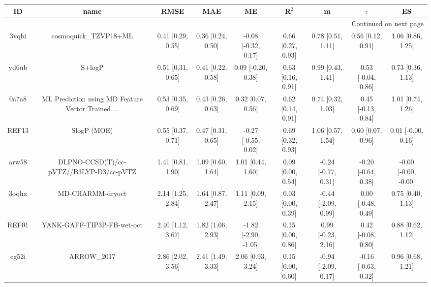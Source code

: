 \documentclass{article}
\begin{document}
\begin{center}
\scriptsize
\begin{longtable}{|ccccccccc|}
\toprule
    ID &                                               name &               RMSE &                MAE &                    ME &              R$^2$ &                    m &               $\tau$ &                    ES \\
\midrule
\endhead
\midrule
\multicolumn{9}{r}{{Continued on next page}} \\
\midrule
\endfoot

\bottomrule
\endlastfoot
 3vqbi &                              cosmoquick\_TZVP18+ML &  0.41 [0.29, 0.55] &  0.36 [0.24, 0.50] &   -0.08 [-0.32, 0.17] &  0.66 [0.27, 0.93] &    0.78 [0.51, 1.11] &    0.56 [0.12, 0.91] &     1.06 [0.86, 1.25] \\
 yd6ub &                                             S+logP &  0.51 [0.31, 0.65] &  0.41 [0.22, 0.58] &    0.09 [-0.20, 0.38] &  0.63 [0.16, 0.91] &    0.99 [0.43, 1.41] &   0.53 [-0.04, 0.86] &     0.73 [0.36, 1.13] \\
 0a7a8 &  ML Prediction using MD Feature Vector Trained ... &  0.53 [0.35, 0.69] &  0.43 [0.26, 0.63] &     0.32 [0.07, 0.56] &  0.62 [0.14, 0.91] &    0.74 [0.32, 1.03] &   0.45 [-0.13, 0.84] &     1.01 [0.74, 1.26] \\
 REF13 &                                        SlogP (MOE) &  0.55 [0.37, 0.71] &  0.47 [0.31, 0.65] &   -0.27 [-0.55, 0.02] &  0.69 [0.32, 0.93] &    1.06 [0.57, 1.54] &    0.60 [0.07, 0.96] &    0.01 [-0.00, 0.16] \\
 arw58 &            DLPNO-CCSD(T)/cc-pVTZ//B3LYP-D3/cc-pVTZ &  1.41 [0.81, 1.90] &  1.09 [0.60, 1.64] &     1.01 [0.44, 1.60] &  0.09 [0.00, 0.54] &  -0.24 [-0.77, 0.31] &  -0.20 [-0.64, 0.38] &  -0.00 [-0.00, -0.00] \\
 3oqhx &                                   MD-CHARMM-dryoct &  2.14 [1.25, 2.84] &  1.64 [0.87, 2.47] &     1.11 [0.09, 2.15] &  0.03 [0.00, 0.39] &  -0.44 [-2.09, 0.99] &   0.00 [-0.48, 0.49] &     0.75 [0.40, 1.13] \\
 REF01 &                         YANK-GAFF-TIP3P-FB-wet-oct &  2.40 [1.12, 3.67] &  1.82 [1.06, 2.93] &  -1.82 [-2.90, -1.05] &  0.15 [0.00, 0.86] &   0.99 [-0.23, 2.16] &   0.42 [-0.08, 0.80] &     0.88 [0.62, 1.12] \\
 eg52i &                                        ARROW\_2017 &  2.86 [2.02, 3.56] &  2.41 [1.49, 3.33] &     2.06 [0.93, 3.24] &  0.15 [0.00, 0.60] &  -0.94 [-2.09, 0.17] &  -0.16 [-0.63, 0.32] &     0.96 [0.68, 1.21] \\
\end{longtable}
\end{center}
\end{document}
